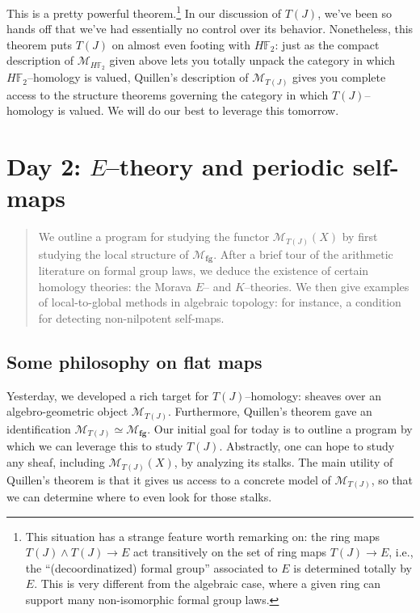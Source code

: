 \documentclass{amsart}
\newcommand{\F}{\mathbb F}
\newcommand{\M}{\mathcal{M}}
\newcommand{\<}{\langle}
\renewcommand{\>}{\rangle}
\newcommand{\sm}{\wedge}
\newcommand{\moduli}[1]{\mathcal{M}_{\mathbf{#1}}}
\theoremstyle{plain}
\theoremstyle{definition}
\theoremstyle{remark}
\begin{document}
This is a pretty powerful theorem.\footnote{This situation has a strange feature worth remarking on: the ring maps $T(J) \sm T(J) \to E$ act transitively on the set of ring maps $T(J) \to E$, i.e., the ``(decoordinatized) formal group'' associated to $E$ is determined totally by $E$.  This is very different from the algebraic case, where a given ring can support many non-isomorphic formal group laws.}  In our discussion of $T(J)$, we've been so hands off that we've had essentially no control over its behavior.  Nonetheless, this theorem puts $T(J)$ on almost even footing with $H\F_2$: just as the compact description of $\M_{H\F_2}$ given above lets you totally unpack the category in which $H\F_2$--homology is valued, Quillen's description of $\M_{T(J)}$ gives you complete access to the structure theorems governing the category in which $T(J)$--homology is valued.  We will do our best to leverage this tomorrow.













\newpage
\section{Day 2: $E$--theory and periodic self-maps}

\begin{abstract}
We outline a program for studying the functor $\M_{T(J)}(X)$ by first studying the local structure of $\moduli{fg}$.  After a brief tour of the arithmetic literature on formal group laws, we deduce the existence of certain homology theories: the Morava $E$-- and $K$--theories.  We then give examples of local-to-global methods in algebraic topology: for instance, a condition for detecting non-nilpotent self-maps.
\end{abstract}


\subsection{Some philosophy on flat maps}

Yesterday, we developed a rich target for $T(J)$--homology: sheaves over an algebro-geometric object $\M_{T(J)}$.  Furthermore, Quillen's theorem gave an identification $\M_{T(J)} \simeq \moduli{fg}$.  Our initial goal for today is to outline a program by which we can leverage this to study $T(J)$.  Abstractly, one can hope to study any sheaf, including $\M_{T(J)}(X)$, by analyzing its stalks.  The main utility of Quillen's theorem is that it gives us access to a concrete model of $\M_{T(J)}$, so that we can determine where to even look for those stalks.
\end{document}
